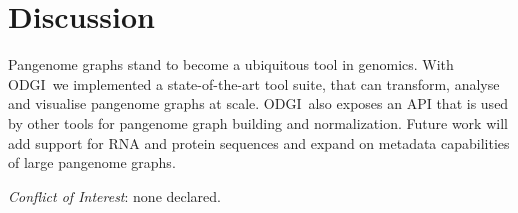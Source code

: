 \documentclass{bioinfo}
\newcommand{\odgi}{ODGI}
\begin{document}
    \section{Discussion}

    Pangenome graphs stand to become a ubiquitous tool in
    genomics\citep{Eizenga:2020}.  With \odgi\ we implemented a
    state-of-the-art tool suite, that can transform, analyse and
    visualise pangenome graphs at scale.  \odgi\ also exposes an API
    that is used by other tools for pangenome graph building and
    normalization. Future work will add support for RNA and protein
    sequences and expand on metadata capabilities of large pangenome
    graphs.



%
%


    \textit{Conflict of Interest}: none declared.
    \vspace*{+24pt}








%
%
%
%
%
%
%
%


\end{document}
